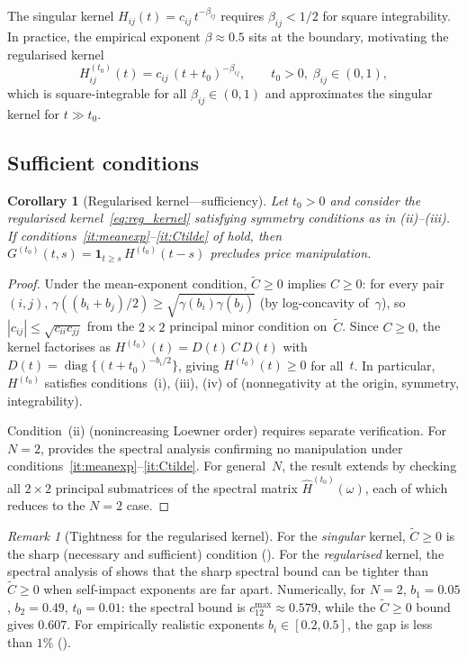 \documentclass[12pt]{article}
\newtheorem{corollary}[theorem]{Corollary}
\theoremstyle{definition}
\theoremstyle{remark}
\newtheorem{remark}[theorem]{Remark}
\newcommand{\bC}{\widetilde{C}}
\newcommand{\diag}{\operatorname{diag}}
\begin{document}
The singular kernel $H_{ij}(t) = c_{ij}\,t^{-\beta_{ij}}$ requires
$\beta_{ij} < 1/2$ for square integrability.  In practice, the empirical
exponent $\beta\approx 0.5$ sits at the boundary, motivating the regularised
kernel
\begin{equation}\label{eq:reg_kernel}
  H_{ij}^{(t_0)}(t) = c_{ij}\,(t+t_0)^{-\beta_{ij}},\qquad t_0>0,\;\beta_{ij}\in(0,1),
\end{equation}
which is square-integrable for all $\beta_{ij}\in(0,1)$ and approximates
the singular kernel for $t\gg t_0$.

\subsection{Sufficient conditions}\label{sec:reg_suff}

\begin{corollary}[Regularised kernel---sufficiency]\label{cor:regularised}
Let $t_0>0$ and consider the regularised kernel~\eqref{eq:reg_kernel}
satisfying symmetry conditions as in (ii)--(iii).
If conditions~\ref{it:meanexp}--\ref{it:Ctilde} of  hold, then
$G^{(t_0)}(t,s) = \mathbf{1}_{t\ge s}\,H^{(t_0)}(t-s)$ precludes price manipulation.
\end{corollary}

\begin{proof}
Under the mean-exponent condition, $\bC\ge 0$ implies $C\ge 0$:
for every pair~$(i,j)$,
$\gamma((b_i{+}b_j)/2)\ge \sqrt{\gamma(b_i)\gamma(b_j)}$
(by log-concavity of~$\gamma$), so $|c_{ij}|\le\sqrt{c_{ii}c_{jj}}$
from the $2\times 2$ principal minor condition on~$\bC$.
Since $C\ge 0$, the kernel factorises as
$H^{(t_0)}(t) = D(t)\,C\,D(t)$ with
$D(t)=\diag\{(t{+}t_0)^{-b_i/2}\}$, giving $H^{(t_0)}(t)\ge 0$
for all~$t$.  In particular, $H^{(t_0)}$ satisfies
conditions~(i), (iii), (iv) of
\cite[Thm.~2.15]{AbiJaberNeumanTuschmann2026}
(nonnegativity at the origin, symmetry, integrability).

Condition~(ii) (nonincreasing Loewner order) requires
separate verification.  For $N=2$, 
provides the spectral analysis confirming no manipulation under
conditions~\ref{it:meanexp}--\ref{it:Ctilde}.
For general~$N$, the result extends by checking
all $2\times 2$ principal submatrices of the spectral matrix
$\widehat{H}^{(t_0)}(\omega)$, each of which reduces to the $N=2$ case.
\end{proof}

\begin{remark}[Tightness for the regularised kernel]\label{rem:CvCtilde}
For the \emph{singular} kernel, $\bC\ge 0$ is the sharp (necessary and sufficient)
condition ().  For the \emph{regularised} kernel, the spectral
analysis of  shows that the
sharp spectral bound can be tighter than $\bC\ge 0$ when self-impact
exponents are far apart.  Numerically, for $N=2$, $b_1=0.05$,
$b_2=0.49$, $t_0=0.01$: the spectral bound is
$c_{12}^{\max}\approx 0.579$, while the $\bC\ge 0$ bound gives $0.607$.
For empirically realistic exponents $b_i\in[0.2,0.5]$, the gap is
less than $1\%$ ().
\end{remark}
\end{document}
